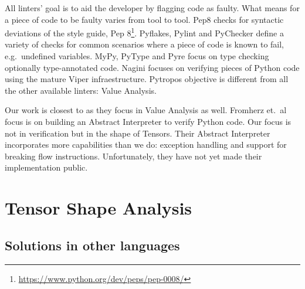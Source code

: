 All linters' goal is to aid the developer by flagging code as faulty. What means for a
piece of code to be faulty varies from tool to tool. Pep8 checks for syntactic deviations
of the style guide, Pep 8\footnote{\url{https://www.python.org/dev/peps/pep-0008/}}.
Pyflakes, Pylint and PyChecker define a variety of checks for common scenarios where a
piece of code is known to fail, e.g.~undefined variables. MyPy, PyType and Pyre focus on
type checking optionally type-annotated code. Nagini focuses on verifying pieces of Python
code using the mature Viper \autocite{muller_viper_2016} infraestructure. Pytropos
objective is different from all the other available linters: Value Analysis.

Our work is closest to \textcite{fromherz_static_2018} as they focus in Value Analysis as
well. Fromherz et.~al focus is on building an Abstract Interpreter to verify Python code.
Our focus is not in verification but in the shape of Tensors. Their Abstract Interpreter
incorporates more capabilities than we do: exception handling and support for breaking
flow instructions. Unfortunately, they have not yet made their implementation public.

\section{Tensor Shape Analysis}

%

\subsection{Solutions in other languages}

